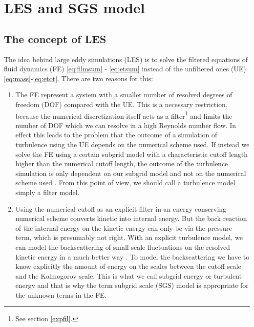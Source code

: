 \chapter{LES and SGS model}\label{LES}
\section{The concept of LES}
The idea behind large eddy simulations (LES) is to solve the filtered equations
of fluid dynamics (FE) \eqref{eq:filmsum} - \eqref{eq:etsum} instead of the
unfiltered ones (UE) \eqref{eq:mass}-\eqref{eq:etot}. There are two reasons for
this:
\begin{enumerate}
\item The FE represent a system with a smaller
number of resolved degrees of freedom (DOF) compared with the UE. This is a
necessary restriction, because the numerical discretization itself acts as a
filter\footnote{See section \ref{expfil}.} and limits the number of DOF which we
can resolve in a high Reynolds number flow. In effect this leads to the problem
that the outcome of a simulation of turbulence using the UE depends on the
numerical scheme used. If instead we solve the FE using a certain subgrid model
with a characteristic cutoff length higher than the numerical cutoff length, the
outcome of the turbulence simulation is only dependent on our subgrid model and
not on the numerical scheme used \citep{Mason1999}. From this point of view, we
should call a turbulence model simply a filter model.
\item Using the numerical cutoff as an explicit filter in an energy
conserving numerical scheme converts kinetic into internal energy. But
the back reaction of the internal energy on the kinetic energy can only be 
via the pressure term, which is presumably not right. With an explicit
turbulence model, we can model the backscattering of small scale fluctuations
on the resolved kinetic energy in a much better way \citep{Schmidt2004}. To
model the backscattering we have to know explicitly the amount of energy on the
scales between the cutoff scale and the Kolmogorov scale. This is what we call
subgrid energy or turbulent energy and that is why the term subgrid scale 
(SGS) model is appropriate for the unknown terms in the FE.
\end{enumerate}


